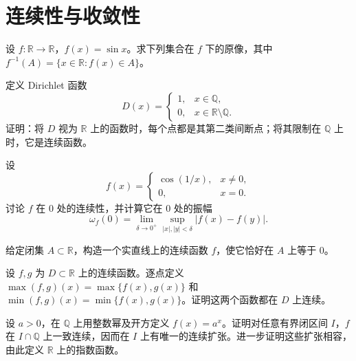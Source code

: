 \renewcommand{\thesection}{\arabic{section}}\renewcommand{\theHsection}{chapter.\arabic{section}}\setcounter{section}{14}\section{连续性与收敛性}
\noindent\begin{minipage}{\textwidth}
设 $f:\mathbb R\to\mathbb R$，$f(x)=\sin x$。求下列集合在 $f$ 下的原像，其中 $f^{-1}(A)=\{x\in\mathbb R:f(x)\in A\}$。
\SubQ{2}{$[1,+\infty)$。}
\end{minipage}\par\vfill
\noindent\begin{minipage}{\textwidth}
定义 Dirichlet 函数\[D(x)=\begin{cases}1,&x\in\mathbb Q,\\0,&x\in\mathbb R\setminus\mathbb Q.\end{cases}\]证明：将 $D$ 视为 $\mathbb R$ 上的函数时，每个点都是其第二类间断点；将其限制在 $\mathbb Q$ 上时，它是连续函数。
\end{minipage}\par\vfill
\noindent\begin{minipage}{\textwidth}
设\[f(x)=\begin{cases}\cos(1/x),&x\ne0,\\0,&x=0.\end{cases}\]讨论 $f$ 在 $0$ 处的连续性，并计算它在 $0$ 处的振幅\[\omega_f(0)=\lim_{\delta\to0^+}\sup_{|x|,|y|<\delta}|f(x)-f(y)|.\]
\end{minipage}\par\vfill
\noindent\begin{minipage}{\textwidth}
给定闭集 $A\subset\mathbb R$，构造一个实直线上的连续函数 $f$，使它恰好在 $A$ 上等于 $0$。
\end{minipage}\par\vfill
\newpage
\noindent\begin{minipage}{\textwidth}
设 $f,g$ 为 $D\subset\mathbb R$ 上的连续函数。逐点定义 $\max(f,g)(x)=\max\{f(x),g(x)\}$ 和 $\min(f,g)(x)=\min\{f(x),g(x)\}$。证明这两个函数都在 $D$ 上连续。
\end{minipage}\par\vfill
\noindent\begin{minipage}{\textwidth}
设 $a>0$，在 $\mathbb Q$ 上用整数幂及开方定义 $f(x)=a^x$。证明对任意有界闭区间 $I$，$f$ 在 $I\cap\mathbb Q$ 上一致连续，因而在 $I$ 上有唯一的连续扩张。进一步证明这些扩张相容，由此定义 $\mathbb R$ 上的指数函数。
\end{minipage}\par\vfill
